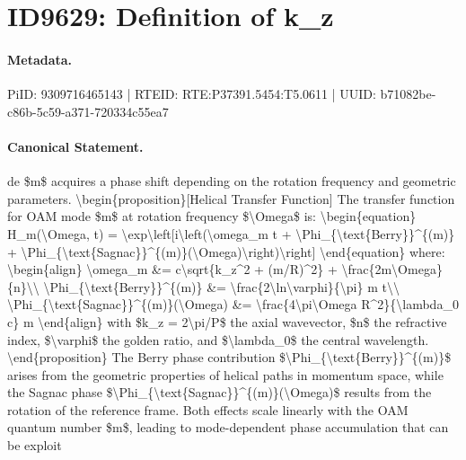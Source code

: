 \section*{ID9629: Definition of k\_z}
\paragraph{Metadata.}
PiID: 9309716465143 | RTEID: RTE:P37391.5454:T5.0611 | UUID: b71082be-c86b-5c59-a371-720334c55ea7

\paragraph{Canonical Statement.}
de \$m\$ acquires a phase shift depending on the rotation frequency and geometric parameters. \textbackslash{}begin\{proposition\}[Helical Transfer Function] The transfer function for OAM mode \$m\$ at rotation frequency \$\textbackslash{}Omega\$ is: \textbackslash{}begin\{equation\} H\_m(\textbackslash{}Omega, t) = \textbackslash{}exp\textbackslash{}left[i\textbackslash{}left(\textbackslash{}omega\_m t + \textbackslash{}Phi\_\{\textbackslash{}text\{Berry\}\}\textasciicircum{}\{(m)\} + \textbackslash{}Phi\_\{\textbackslash{}text\{Sagnac\}\}\textasciicircum{}\{(m)\}(\textbackslash{}Omega)\textbackslash{}right)\textbackslash{}right] \textbackslash{}end\{equation\} where: \textbackslash{}begin\{align\} \textbackslash{}omega\_m \&= c\textbackslash{}sqrt\{k\_z\textasciicircum{}2 + (m/R)\textasciicircum{}2\} + \textbackslash{}frac\{2m\textbackslash{}Omega\}\{n\}\textbackslash{}\textbackslash{} \textbackslash{}Phi\_\{\textbackslash{}text\{Berry\}\}\textasciicircum{}\{(m)\} \&= \textbackslash{}frac\{2\textbackslash{}ln\textbackslash{}varphi\}\{\textbackslash{}pi\} m t\textbackslash{}\textbackslash{} \textbackslash{}Phi\_\{\textbackslash{}text\{Sagnac\}\}\textasciicircum{}\{(m)\}(\textbackslash{}Omega) \&= \textbackslash{}frac\{4\textbackslash{}pi\textbackslash{}Omega R\textasciicircum{}2\}\{\textbackslash{}lambda\_0 c\} m \textbackslash{}end\{align\} with \$k\_z = 2\textbackslash{}pi/P\$ the axial wavevector, \$n\$ the refractive index, \$\textbackslash{}varphi\$ the golden ratio, and \$\textbackslash{}lambda\_0\$ the central wavelength. \textbackslash{}end\{proposition\} The Berry phase contribution \$\textbackslash{}Phi\_\{\textbackslash{}text\{Berry\}\}\textasciicircum{}\{(m)\}\$ arises from the geometric properties of helical paths in momentum space, while the Sagnac phase \$\textbackslash{}Phi\_\{\textbackslash{}text\{Sagnac\}\}\textasciicircum{}\{(m)\}(\textbackslash{}Omega)\$ results from the rotation of the reference frame. Both effects scale linearly with the OAM quantum number \$m\$, leading to mode-dependent phase accumulation that can be exploit


